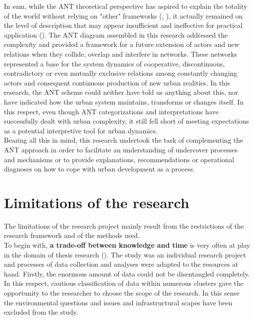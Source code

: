 \documentclass[11pt]{report}
\begin{document}
{{{In sum, while the ANT theoretical perspective has aspired to explain the totality of the world without relying on "other" frameworks (\href{ref}{\citealt{lee_otherness_1994}},  \href{ref}{\citealt{gad_consequences_2010}}), it actually remained on the level of description that may appear insufficient and ineffective for practical application (\href{ref}{\citealt{gabriel_post-social_2008}}).
The ANT diagram assembled in this research addressed the complexity and provided a framework for a future extension of actors and new relations when they collide, overlap and interfere in networks. These networks represented a base for the system dynamics of cooperative, discontinuous, contradictory or even mutually exclusive relations among constantly changing actors and consequent continuous production of new urban realities. In this research, the ANT scheme could neither have told us anything about this, nor have indicated how the urban system maintains, transforms or changes itself. In this respect, even though ANT categorizations and interpretations have successfully dealt with urban complexity, it still fell short of meeting expectations as a potential interpretive tool for urban dynamics.
\\

Bearing all this in mind, this research undertook the task of complementing the ANT approach in order to facilitate an understanding of undercover processes and mechanisms or to provide explanations, recommendations or operational diagnoses on how to cope with urban development as a process.

\section{Limitations of the research}

The limitations of the research project mainly result from the restrictions of the research framework and of the methods used.
\\

To begin with, \textbf{a trade-off between knowledge and time} is very often at play in the domain of thesis research (\href{Harrison}{\citealt{Harrison 2002}}).
The study was an individual research project and processes of data collection and analyses were adapted to the resources at hand.
Firstly, the enormous amount of data could not be disentangled completely. In this respect, cautious classification of data within numerous clusters gave the opportunity to the researcher to choose the scope of the research.
In this sense the environmental questions and issues and infrastructural scapes have been excluded from the study.
\\

}}}
\end{document}
